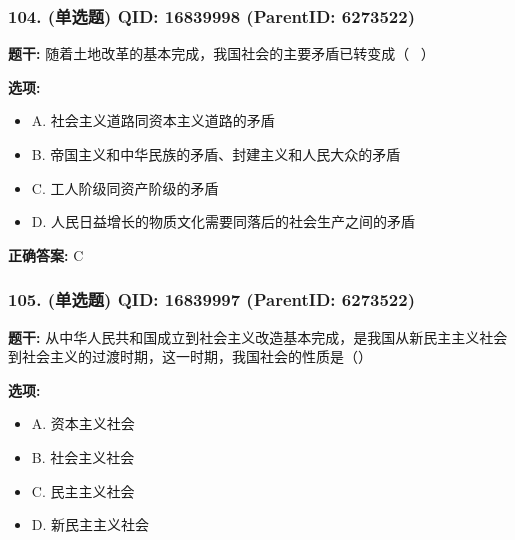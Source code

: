 \documentclass[12pt,UTF8]{ctexart}
\begin{document}
\vspace{0.3em}\hrulefill\vspace{0.7em}

\subsubsection*{104. (单选题) \small QID: 16839998 (ParentID: 6273522)}

\textbf{题干:}
随着土地改革的基本完成，我国社会的主要矛盾已转变成（  ）



\textbf{选项:}
\begin{itemize}[leftmargin=*]

  \item A. 社会主义道路同资本主义道路的矛盾

  \item B. 帝国主义和中华民族的矛盾、封建主义和人民大众的矛盾

  \item C. 工人阶级同资产阶级的矛盾

  \item D. 人民日益增长的物质文化需要同落后的社会生产之间的矛盾

\end{itemize}

\textbf{正确答案:}
C

\vspace{0.3em}\hrulefill\vspace{0.7em}

\subsubsection*{105. (单选题) \small QID: 16839997 (ParentID: 6273522)}

\textbf{题干:}
从中华人民共和国成立到社会主义改造基本完成，是我国从新民主主义社会到社会主义的过渡时期，这一时期，我国社会的性质是（）



\textbf{选项:}
\begin{itemize}[leftmargin=*]

  \item A. 资本主义社会

  \item B. 社会主义社会

  \item C. 民主主义社会

  \item D. 新民主主义社会

\end{itemize}
\end{document}
